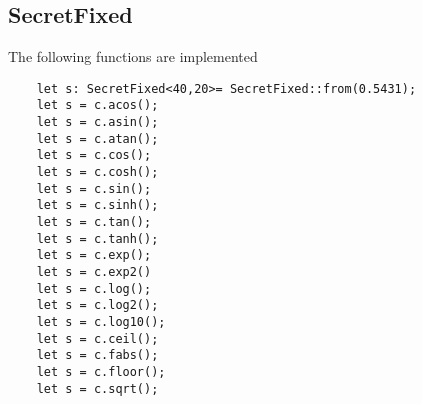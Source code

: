 \subsection{SecretFixed}
The following functions are implemented
\begin{lstlisting}
    let s: SecretFixed<40,20>= SecretFixed::from(0.5431);
    let s = c.acos();
    let s = c.asin();
    let s = c.atan();
    let s = c.cos();
    let s = c.cosh();
    let s = c.sin();
    let s = c.sinh();
    let s = c.tan();
    let s = c.tanh();
    let s = c.exp();
    let s = c.exp2()
    let s = c.log();
    let s = c.log2();
    let s = c.log10();
    let s = c.ceil();
    let s = c.fabs();
    let s = c.floor();
    let s = c.sqrt();
\end{lstlisting}

